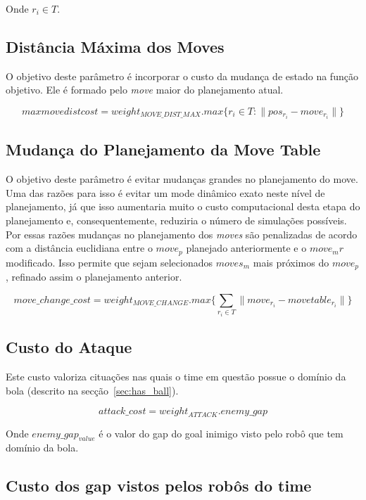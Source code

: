 Onde $r_i \in T$.

\subsection{Distância Máxima dos Moves} 

O objetivo deste parâmetro é incorporar o custo da
mudança de estado na função objetivo. Ele é formado pelo \textit{move}
maior do planejamento atual.

\begin{dmath} 
 max move dist cost = weight_{MOVE{\_}DIST{\_}MAX} . 
 max \lbrace r_i \in T : \lVert pos_{r_i} - move_{r_i}\rVert \rbrace
\end{dmath} 

\subsection{Mudança do Planejamento da Move Table}
O objetivo deste parâmetro é evitar mudanças grandes no
planejamento do move. Uma das razões para isso é evitar um mode dinâmico
exato neste nível de planejamento, já que isso aumentaria muito o custo
computacional desta etapa do planejamento e, consequentemente, reduziria
o número de simulações possíveis. Por essas razões mudanças no planejamento
dos \textit{moves} são penalizadas de acordo com a distância euclidiana
entre o $move_p$ planejado anteriormente e o $move_mr$ modificado.
Isso permite que sejam selecionados $moves_m$ mais próximos do
$move_p$, refinado assim o planejamento anterior.

\begin{dmath} 
 move{\_}change{\_}cost = weight_{MOVE{\_}CHANGE} . 
 max \lbrace \sum_{r_i \in T} \lVert move_{r_i} - move table_{r_i}\rVert \rbrace
\end{dmath} 

\subsection{Custo do Ataque}
Este custo valoriza cituações nas quais o time em questão
possue o domínio da bola (descrito na secção~\ref{sec:has_ball}).

\begin{dmath} 
 attack{\_}cost = weight_{ATTACK} . enemy{\_}gap
\end{dmath} 

Onde $enemy{\_}gap_{value}$ é o valor do gap do goal inimigo visto
pelo robô que tem domínio da bola.

\subsection{Custo dos gap vistos pelos robôs do time}

